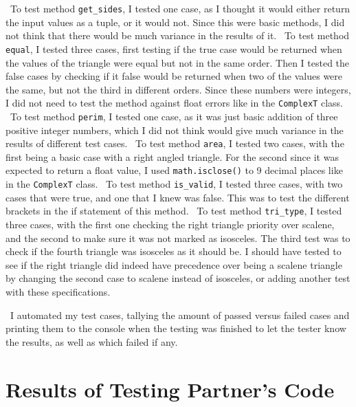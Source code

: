 \documentclass[12pt]{article}
\begin{document}
~\newline\noindent To test method \verb|get_sides|, I tested one case, as I thought 
it would either return the input values as a tuple, or it would not. Since this 
were basic methods, I did not think that there would be much variance in the results 
of it. 
~\newline\noindent To test method \verb|equal|, I tested three cases, first testing 
if the true case would be returned when the values of the triangle were equal but 
not in the same order. Then I tested the false cases by checking if it false would 
be returned when two of the values were the same, but not the third in different 
orders. Since these numbers were integers, I did not need to test the method 
against float errors like in the \verb|ComplexT| class. 
~\newline\noindent To test method \verb|perim|, I tested one case, as it was just 
basic addition of three positive integer numbers, which I did not think would 
give much variance in the results of different test cases. 
~\newline\noindent To test method \verb|area|, I tested two cases, with the first 
being a basic case with a right angled triangle. For the second since it was 
expected to return a float value, I used \verb|math.isclose()| to 9 decimal 
places like in the \verb|ComplexT| class. 
~\newline\noindent To test method \verb|is_valid|, I tested three cases, with 
two cases that were true, and one that I knew was false. This was to test the 
different brackets in the if statement of this method. 
~\newline\noindent To test method \verb|tri_type|, I tested three cases, with 
the first one checking the right triangle priority over scalene, and the second 
to make sure it was not marked as isosceles. The third test was to check if the 
fourth triangle was isosceles as it should be. I should have tested to see if 
the right triangle did indeed have precedence over being a scalene triangle 
by changing the second case to scalene instead of isosceles, or adding another 
test with these specifications. 

~\newline\noindent I automated my test cases, tallying the amount of passed 
versus failed cases and printing them to the console when the testing was 
finished to let the tester know the results, as well as which failed if any. 

\section{Results of Testing Partner's Code}
\end{document}

